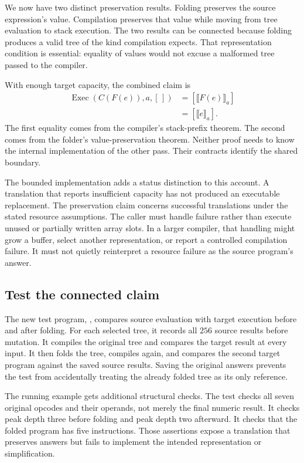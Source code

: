 We now have two distinct preservation results.
Folding preserves the source expression's value.
Compilation preserves that value while moving from tree evaluation to stack execution.
The two results can be connected because folding produces a valid tree of the kind compilation expects.
That representation condition is essential: equality of values would not excuse a malformed tree passed to the compiler.

With enough target capacity, the combined claim is
\begin{align*}
  \operatorname{Exec}(C(F(e)),a,[\,])
    &= [\llbracket F(e)\rrbracket_a]\\
    &= [\llbracket e\rrbracket_a].
\end{align*}
The first equality comes from the compiler's stack-prefix theorem.
The second comes from the folder's value-preservation theorem.
Neither proof needs to know the internal implementation of the other pass.
Their contracts identify the shared boundary.

The bounded implementation adds a status distinction to this account.
A translation that reports insufficient capacity has not produced an executable replacement.
The preservation claim concerns successful translations under the stated resource assumptions.
The caller must handle failure rather than execute unused or partially written array slots.
In a larger compiler, that handling might grow a buffer, select another representation, or report a controlled compilation failure.
It must not quietly reinterpret a resource failure as the source program's answer.

\subsection{Test the connected claim}
\label{sec:tiny-stack-testing}

The new test program, , compares source evaluation with target execution before and after folding.
For each selected tree, it records all $256$ source results before mutation.
It compiles the original tree and compares the target result at every input.
It then folds the tree, compiles again, and compares the second target program against the saved source results.
Saving the original answers prevents the test from accidentally treating the already folded tree as its only reference.

The running example gets additional structural checks.
The test checks all seven original opcodes and their operands, not merely the final numeric result.
It checks peak depth three before folding and peak depth two afterward.
It checks that the folded program has five instructions.
Those assertions expose a translation that preserves answers but fails to implement the intended representation or simplification.

